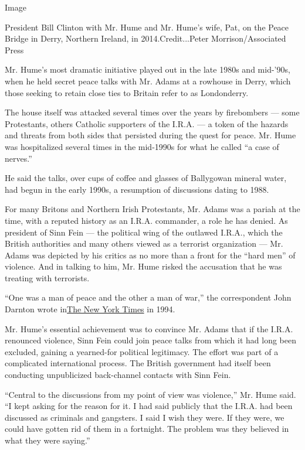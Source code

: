 Image

President Bill Clinton with Mr. Hume and Mr. Hume's wife, Pat, on the
Peace Bridge in Derry, Northern Ireland, in 2014.Credit...Peter
Morrison/Associated Press

Mr. Hume's most dramatic initiative played out in the late 1980s and
mid-'90s, when he held secret peace talks with Mr. Adams at a rowhouse
in Derry, which those seeking to retain close ties to Britain refer to
as Londonderry.

The house itself was attacked several times over the years by
firebombers --- some Protestants, others Catholic supporters of the
I.R.A. --- a token of the hazards and threats from both sides that
persisted during the quest for peace. Mr. Hume was hospitalized several
times in the mid-1990s for what he called ``a case of nerves.''

He said the talks, over cups of coffee and glasses of Ballygowan mineral
water, had begun in the early 1990s, a resumption of discussions dating
to 1988.

For many Britons and Northern Irish Protestants, Mr. Adams was a pariah
at the time, with a reputed history as an I.R.A. commander, a role he
has denied. As president of Sinn Fein --- the political wing of the
outlawed I.R.A., which the British authorities and many others viewed as
a terrorist organization --- Mr. Adams was depicted by his critics as no
more than a front for the ``hard men'' of violence. And in talking to
him, Mr. Hume risked the accusation that he was treating with
terrorists.

``One was a man of peace and the other a man of war,'' the correspondent
John Darnton wrote
in\href{http://www.nytimes.com/1994/09/05/world/turning-point-ira-cease-fire-special-report-2-irish-foes-journey-deeds-words.html?pagewanted=1}{The
New York Times} in 1994.

Mr. Hume's essential achievement was to convince Mr. Adams that if the
I.R.A. renounced violence, Sinn Fein could join peace talks from which
it had long been excluded, gaining a yearned-for political legitimacy.
The effort was part of a complicated international process. The British
government had itself been conducting unpublicized back-channel contacts
with Sinn Fein.

``Central to the discussions from my point of view was violence,'' Mr.
Hume said. ``I kept asking for the reason for it. I had said publicly
that the I.R.A. had been discussed as criminals and gangsters. I said I
wish they were. If they were, we could have gotten rid of them in a
fortnight. The problem was they believed in what they were saying.''

